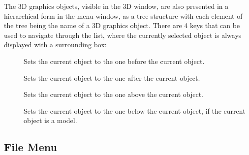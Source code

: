 The 3D graphics objects, visible in the 3D window, are also presented
in a hierarchical form in the menu window, as a tree structure with
each element of the tree being the name of a 3D graphics object.
There are 4 keys that can be used to navigate through the list, where
the currently selected object is always displayed with a surrounding
box:

\begin{description}
\item[]  Sets the current object to the one before
                the current object.
\item[]  Sets the current object to the one after
                the current object.
\item[]  Sets the current object to the one above
                the current object.
\item[]  Sets the current object to the one below
                the current object, if the current object is a model.
\end{description}

\subsection{File Menu}

